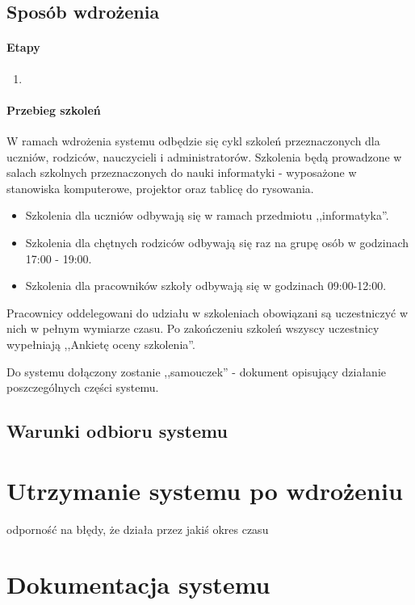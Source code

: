 \documentclass{article}
\begin{document}
\subsection{Sposób wdrożenia}
\paragraph{Etapy}
\begin{enumerate}
\item 
\end{enumerate}
\paragraph{Przebieg szkoleń}
W ramach wdrożenia systemu odbędzie się cykl szkoleń przeznaczonych dla uczniów, rodziców, nauczycieli i administratorów. Szkolenia będą prowadzone w salach szkolnych przeznaczonych do nauki informatyki - wyposażone w stanowiska komputerowe, projektor oraz tablicę do rysowania.
\begin{itemize}
\item Szkolenia dla uczniów odbywają się w ramach przedmiotu ,,informatyka''.
\item Szkolenia dla chętnych rodziców odbywają się raz na grupę osób w godzinach 17:00 - 19:00.
\item Szkolenia dla pracowników szkoły odbywają się w godzinach 09:00-12:00.
\end{itemize}
Pracownicy oddelegowani do udziału w szkoleniach obowiązani są uczestniczyć w nich w pełnym wymiarze czasu. Po zakończeniu szkoleń wszyscy uczestnicy wypełniają ,,Ankietę oceny szkolenia''.

Do systemu dołączony zostanie ,,samouczek'' - dokument opisujący działanie poszczególnych części systemu.

\subsection{Warunki odbioru systemu}
\section{Utrzymanie systemu po wdrożeniu}
odporność na błędy, że działa przez jakiś okres czasu

\section{Dokumentacja systemu}
\end{document}
